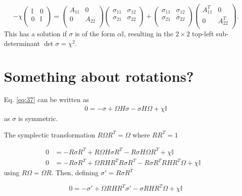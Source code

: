 \documentclass[11pt,a4paper]{article}
\numberwithin{equation}{section}
\begin{document}
	\begin{equation*}
	 -\chi \begin{pmatrix}
	\mathbb{I} & 0  \\
	0 & \mathbb{I}\\
	\end{pmatrix} = \begin{pmatrix}
	A_{11} & 0  \\
	0 & A_{22}\\
	\end{pmatrix}\begin{pmatrix}
	\sigma_{11} & \sigma_{12}  \\
	\sigma_{21} & \sigma_{22}\\
	\end{pmatrix} + \begin{pmatrix}
	\sigma_{11} & \sigma_{12}  \\
	\sigma_{21} & \sigma_{22}\\
	\end{pmatrix}\begin{pmatrix}
	A_{11}^T & 0  \\
	0 & A_{22}^T\\
	\end{pmatrix}.
	\end{equation*}
	This has a solution if $\sigma$ is of the form $\alpha \mathbb{I}$, resulting in the $2 \times 2$ top-left sub-determinant $\det \sigma = \chi^2$.
		
 	\iffalse
	\section{Something about rotations?}
	 
	Eq. \ref{eq:37} can be written as
	\begin{align*} 
	0 = -\sigma + \Omega H\sigma -\sigma H\Omega + \chi \mathbb{I} 
	\end{align*} as $\sigma$ is symmetric. 
	
	The symplectic transformation $R\Omega R^{T} = \Omega$ where $RR^{T}=1$

	\begin{align*} 
	0 &= -R\sigma R^{T} + R\Omega H\sigma R^{T} - R\sigma H\Omega R^{T} + \chi \mathbb{I}&\\
	0 &= -R\sigma R^{T} + \Omega R H R^T R \sigma R^{T} - R\sigma R^{T} RH R^T\Omega + \chi \mathbb{I}& 
	\end{align*}	using $R\Omega = \Omega R$. Then, defining $\sigma' = R\sigma R^T$
	
	\begin{equation*} 
	0 = -\sigma' + \Omega R H R^T \sigma' - \sigma RH R^T\Omega + \chi \mathbb{I}
	\end{equation*}
	
\end{document}
